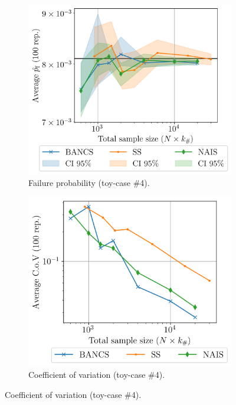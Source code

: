 \begin{figure}
\begin{subfigure}[b]{0.47\linewidth}
    \end{subfigure}
    \begin{subfigure}[b]{0.49\linewidth}
        \centering
        \includegraphics[width=\linewidth]{part3/figures/BANCS/RP38_mean.png}
        \caption{Failure probability (toy-case \#4).}
    \end{subfigure}
    \begin{subfigure}[b]{0.47\linewidth}
        \centering
        \includegraphics[width=\linewidth]{part3/figures/BANCS/RP38_cov.png}
        \caption{Coefficient of variation (toy-case \#4).}
    \end{subfigure}


\end{figure}
